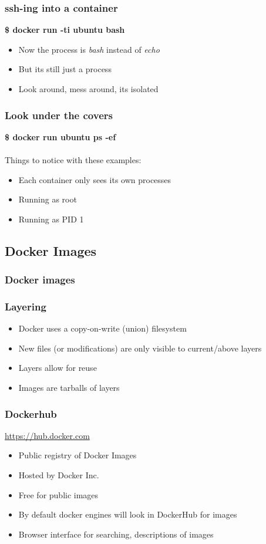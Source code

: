\documentclass[aspectratio=169,11pt,hyperref={colorlinks=true}]{beamer}
\begin{document}
\begin{frame}
    \frametitle{ssh-ing into a container}
    \textbf{\$ docker run -ti ubuntu bash}
    \begin{itemize}
        \item Now the process is \textit{bash} instead of \textit{echo}
        \item But its still just a process
        \item Look around, mess around, its isolated
    \end{itemize}
\end{frame}

\begin{frame}
    \frametitle{Look under the covers}
    \textbf{\$ docker run ubuntu ps -ef} \\
    \\
    Things to notice with these examples:
    \begin{itemize}
        \item Each container only sees its own processes
        \item Running as root
        \item Running as PID 1
    \end{itemize}

\end{frame}
\subsection{Docker Images}
\begin{frame}
    \frametitle{Docker images}
        
\end{frame}

\begin{frame}
    \frametitle{Layering}
    \begin{itemize}
        \item Docker uses a copy-on-write (union) filesystem
        \item New files (or modifications) are only visible to current/above layers
        \item Layers allow for reuse
        \item Images are tarballs of layers
    \end{itemize}
\end{frame}

\begin{frame}
    \frametitle{Dockerhub}
    \href{https:/hub.docker.com}{https://hub.docker.com}
    \begin{itemize}
        \item Public registry of Docker Images
        \item Hosted by Docker Inc.
        \item Free for public images
        \item By default docker engines will look in DockerHub for images
        \item Browser interface for searching, descriptions of images
    \end{itemize}
\end{frame}
\end{document}
